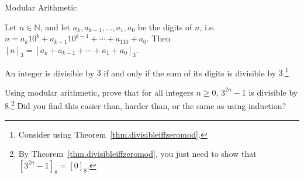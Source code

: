 \begin{section}{Modular Arithmetic}
\begin{theorem}
Let $n\in \mathbb{N}$, and let $a_k, a_{k-1}, \ldots, a_1, a_0$ be the digits of $n$, i.e. $n=a_k10^k + a_{k-1}10^{k-1} + \cdots + a_110 + a_0$. Then $[n]_3 =  [a_k + a_{k-1} + \cdots + a_1 + a_0]_3$.
\end{theorem}

\begin{theorem}
An integer is divisible by $3$ if and only if the sum of its digits is divisible by $3$.\footnote{Consider using Theorem~\ref{thm.divisibleiffzeromod}.}
\end{theorem}

\begin{exercise}
Using modular arithmetic, prove that for all integers $n \ge 0$, $3^{2n}-1$ is divisible by $8$.\footnote{By Theorem~\ref{thm.divisibleiffzeromod}, you just need to show that $[3^{2n}-1]_8 = [0]_8$.} Did you find this easier than, harder than, or the same as using induction?
\end{exercise}

\end{section}
